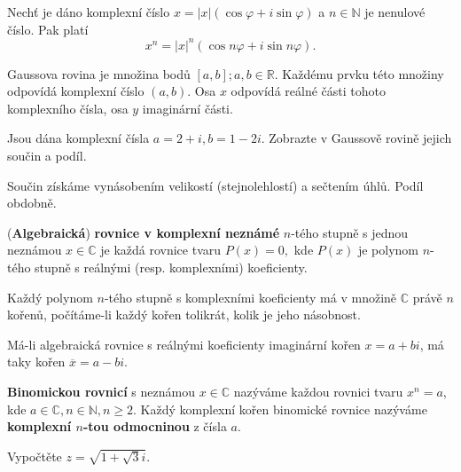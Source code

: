 \begin{veta}
    Nechť je dáno komplexní číslo $x=|x|(\cos \varphi + i \sin \varphi)$ a $n\in \mathbb N$
    je nenulové číslo. Pak platí
    $$x^n = |x|^n (\cos n\varphi + i \sin n \varphi).$$
\end{veta}

\begin{pozn}
    Gaussova rovina je množina bodů $[a,b]; a,b \in \mathbb R$.
    Každému prvku této množiny odpovídá komplexní číslo $(a,b).$ Osa $x$ odpovídá
    reálné části tohoto komplexního čísla, osa $y$ imaginární části.
\end{pozn}

\begin{priklad}
Jsou dána komplexní čísla $a=2+i,b=1-2i$. Zobrazte v Gaussově rovině jejich součin a podíl.
\end{priklad}

\begin{reseni}
Součin získáme vynásobením velikostí (stejnolehlostí) a sečtením úhlů. Podíl obdobně.
\end{reseni}

\begin{definition}
(\textbf{Algebraická}) \textbf{rovnice v komplexní neznámé} $n$-tého stupně s jednou neznámou $x\in \mathbb C$ je každá
rovnice tvaru $P(x)=0,$ kde $P(x)$ je polynom $n$-tého stupně s reálnými (resp.
komplexními) koeficienty.
\end{definition}

\begin{veta}
    Každý polynom $n$-tého stupně s komplexními koeficienty má v množině $\mathbb C$
    právě $n$ kořenů, počítáme-li každý kořen tolikrát, kolik je jeho násobnost.
\end{veta}

\begin{veta}
    Má-li algebraická rovnice s reálnými koeficienty imaginární kořen
    $x = a+bi$, má taky kořen $\overline{x} = a-bi.$
\end{veta}

\begin{definition}
\textbf{Binomickou rovnicí} s neznámou $x\in \mathbb C$ nazýváme každou rovnici
tvaru $x^n=a$, kde $a\in \mathbb C,n\in \mathbb N, n\geq 2.$ Každý komplexní
kořen binomické rovnice nazýváme \textbf{komplexní $n$-tou odmocninou} z čísla $a.$
\end{definition}

\begin{priklad}
Vypočtěte $z=\sqrt{1+\sqrt{3}i }. $
\end{priklad}

